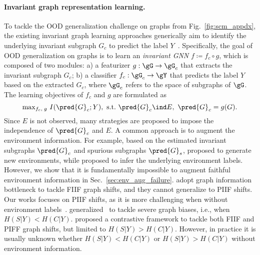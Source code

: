\paragraph{Invariant graph representation learning.}
To tackle the OOD generalization challenge
on graphs from Fig.~\ref{fig:scm_appdx},
the existing invariant graph learning approaches generically
aim to identify the underlying invariant subgraph $G_c$ to predict the label $Y$~\citep{eerm,ciga}.
Specifically, the goal of OOD generalization on graphs
is to learn an \emph{invariant GNN} $f\coloneqq f_c\circ g$,
which is composed of two modules:
a) a featurizer $g:\gG\rightarrow\gG_c$ that extracts the invariant subgraph $G_c$;
b) a classifier $f_c:\gG_c\rightarrow\gY$ that predicts the label $Y$ based on the extracted $G_c$,
where $\gG_c$ refers to the space of subgraphs of $\gG$.
The learning objectives of $f_c$ and $g$ are formulated as
\begin{equation}
    \label{eq:inv_cond_appdx}
    \text{$\max$}_{f_c, \; g} \ I(\pred{G}_{c};Y), \ \text{s.t.}\ \pred{G}_{c}\ind E,\ \pred{G}_{c}=g(G).
\end{equation}
%
Since $E$ is not observed, many strategies are proposed to
impose the independence of $\pred{G}_c$ and $E$.
A common approach is to augment the environment information.
For example, based on the estimated invariant subgraphs $\pred{G}_c$ and spurious subgraphs $\pred{G}_s$,
\citet{dir,grea,eerm} proposed to generate new environments, while \citet{moleood,gil} proposed to infer the underlying environment labels.
However, we show that it is fundamentally impossible to augment faithful environment information in Sec.~\ref{sec:env_aug_failure}.
%
\citet{gib,gsat,dps,lri} adopt graph information bottleneck to tackle FIIF graph shifts, and they cannot generalize to PIIF shifts.
Our works focuses on PIIF shifts, as it is more challenging when without environment labels~\citep{zin}.
%
\citet{disc} generalized~\citep{ldd} to tackle severe graph biases, i.e., when $H(S|Y)< H(C|Y)$.
\citet{ciga} proposed a contrastive framework to tackle both
FIIF and PIFF graph shifts, but limited to $H(S|Y)> H(C|Y)$.
However, in practice it is usually unknown whether $H(S|Y)< H(C|Y)$ or $H(S|Y)> H(C|Y)$ without environment information.

